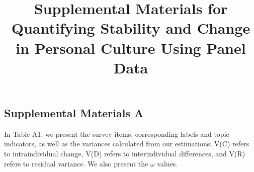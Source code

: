 \documentclass[
  12pt,
]{article}
\title{Supplemental Materials for\\
Quantifying Stability and Change in Personal Culture Using Panel Data}
\author{}
\date{\vspace{-2.5em}}
\begin{document}
\maketitle

{
\setcounter{tocdepth}{2}
\tableofcontents
}
\newpage
\begin{landscape}

\hypertarget{supplemental-materials-a}{%
\section{Supplemental Materials A}\label{supplemental-materials-a}}

In Table A1, we present the survey items, corresponding labels and topic
indicators, as well as the variances calculated from our estimations:
V(C) refers to intraindividual change, V(D) refers to interindividual
differences, and V(R) refers to residual variance. We also present the
\(\omega\) values.


\end{landscape}
\end{document}

